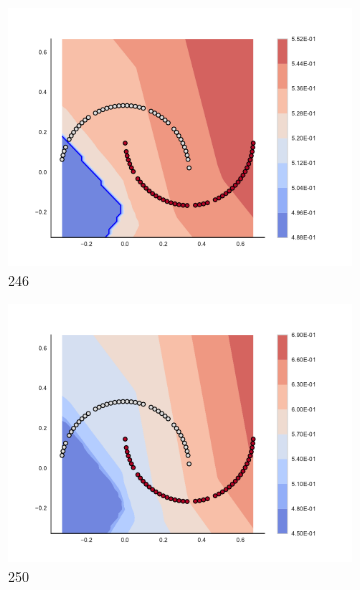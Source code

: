 \begin{figure}[h]
\begin{subfigure}[b]{0.09\textwidth}
    \includegraphics[clip, trim=2.35cm 1.75cm 4.5cm 0cm,width=\textwidth]{img/convergence/246.pdf}
    \caption{246}
    \label{fig:convergence_246}
\end{subfigure}
%
\begin{subfigure}[b]{0.09\textwidth}
    \includegraphics[clip, trim=2.35cm 1.75cm 4.5cm 0cm,width=\textwidth]{img/convergence/250.pdf}
    \caption{250}
    \label{fig:convergence_250}
\end{subfigure}
%
\begin{subfigure}[b]{0.09\textwidth}

\end{subfigure}
\end{figure}
